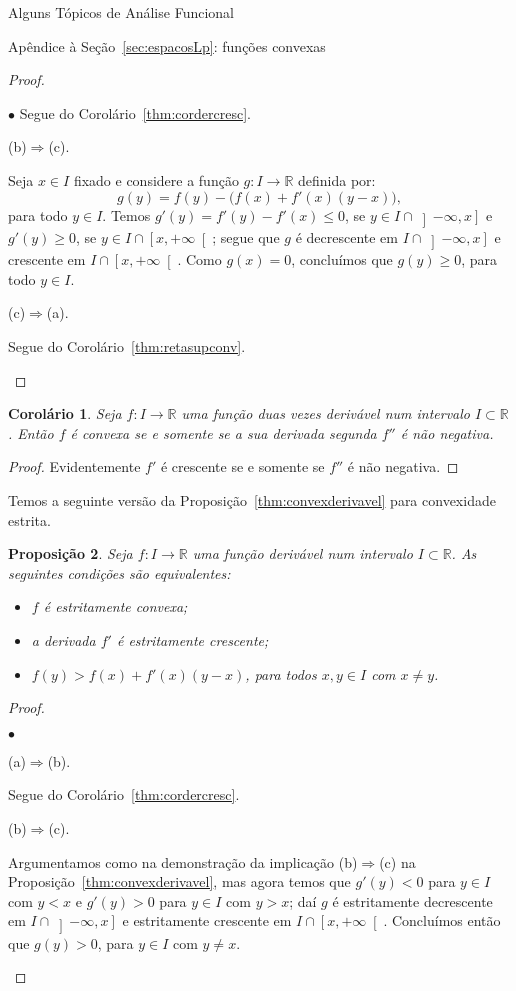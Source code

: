 \documentclass[oneside,final,11pt]{amsbook}
\newcommand{\R}{\mathds R}
\newcounter{contador}
\newenvironment{bulletindent}{\setcounter{contador}{0}
\begin{list} {$\bullet$}
{\usecounter{contador}
\setlength{\leftmargin}{10pt}
\setlength{\rightmargin}{10pt}
\setlength{\labelsep}{5pt}
\setlength{\itemsep}{10pt}
\setlength{\topsep}{10pt}}}
{\end{list}}
\theoremstyle{remark}\newtheorem{exercise}{Exercício}[chapter]
\theoremstyle{remark}\newtheorem{*exercise}[exercise]{\hbox to 0pt{\hskip 0pt minus 1fil*}Exercício}
\theoremstyle{definition}\newtheorem{exdefin}{Definição}[chapter]
\theoremstyle{plain}\newtheorem{teo}{Teorema}[section]
\theoremstyle{plain}\newtheorem{lem}[teo]{Lema}
\theoremstyle{plain}\newtheorem{prop}[teo]{Proposição}
\theoremstyle{plain}\newtheorem{cor}[teo]{Corolário}
\theoremstyle{definition}\newtheorem{defin}[teo]{Definição}
\theoremstyle{remark}\newtheorem{rem}[teo]{Observação}
\theoremstyle{definition}\newtheorem{notation}[teo]{Notação}
\theoremstyle{definition}\newtheorem{convention}[teo]{Convenção}
\theoremstyle{definition}\newtheorem{example}[teo]{Exemplo}
\numberwithin{section}{chapter}
\numberwithin{equation}{section}
\begin{document}
\begin{chapter}{Alguns Tópicos de Análise Funcional}
\begin{section}{Apêndice à Seção~\ref{sec:espacosLp}: funções convexas}
\begin{proof}
\begin{bulletindent}
Segue do Corolário~\ref{thm:cordercresc}.

\item (b)$\Rightarrow$(c).

Seja $x\in I$ fixado e considere a função $g:I\to\R$ definida por:
\[g(y)=f(y)-\big(f(x)+f'(x)(y-x)\big),\]
para todo $y\in I$. Temos $g'(y)=f'(y)-f'(x)\le0$, se $y\in I\cap\left]-\infty,x\right]$ e $g'(y)\ge0$, se $y\in I\cap\left[x,+\infty\right[$;
segue que $g$ é decrescente em $I\cap\left]-\infty,x\right]$ e crescente em
$I\cap\left[x,+\infty\right[$. Como $g(x)=0$, concluímos que $g(y)\ge0$, para todo $y\in I$.

\item (c)$\Rightarrow$(a).

Segue do Corolário~\ref{thm:retasupconv}.\qedhere
\end{bulletindent}
\end{proof}

\begin{cor}
Seja $f:I\to\R$ uma função duas vezes derivável num intervalo $I\subset\R$. Então
$f$ é convexa se e somente se a sua derivada segunda $f''$ é não negativa.
\end{cor}
\begin{proof}
Evidentemente $f'$ é crescente se e somente se $f''$ é não negativa.
\end{proof}

Temos a seguinte versão da Proposição~\ref{thm:convexderivavel} para convexidade estrita.
\begin{prop}
Seja $f:I\to\R$ uma função derivável num intervalo $I\subset\R$. As seguintes condições
são equivalentes:
\begin{itemize}
\item[(a)] $f$ é estritamente convexa;
\item[(b)] a derivada $f'$ é estritamente crescente;
\item[(c)] $f(y)>f(x)+f'(x)(y-x)$, para todos $x,y\in I$ com $x\ne y$.
\end{itemize}
\end{prop}
\begin{proof}\
\begin{bulletindent}
\item (a)$\Rightarrow$(b).

Segue do Corolário~\ref{thm:cordercresc}.

\item (b)$\Rightarrow$(c).

Argumentamos como na demonstração da implicação (b)$\Rightarrow$(c) na Proposição~\ref{thm:convexderivavel},
mas agora temos que $g'(y)<0$ para $y\in I$ com $y<x$ e $g'(y)>0$ para $y\in I$ com $y>x$;
daí $g$ é estritamente decrescente em $I\cap\left]-\infty,x\right]$ e estritamente crescente em
$I\cap\left[x,+\infty\right[$. Concluímos então que $g(y)>0$, para $y\in I$ com $y\ne x$.


\end{bulletindent}
\end{proof}
\end{section}
\end{chapter}
\end{document}
